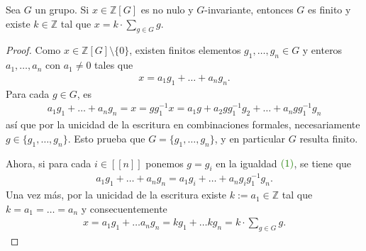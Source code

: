 \documentclass[11pt]{article}
\newcommand{\Z}{\mathbb{Z}}
\newcommand{\nat}[1]{[\![#1]\!]}
\newcommand{\paint}[1]{\color{color}{#1}}
\newenvironment{lemma}[2][Lema]{\begin{trivlist}
\item[\hskip \labelsep \paint{{\bfseries #1}}\hskip \labelsep {\bfseries #2.}]}{\end{trivlist}}
\begin{document}
\begin{lemma}{4} Sea $G$ un grupo. Si $x \in \Z[G]$ es no nulo y $G$-invariante, entonces $G$ es finito y existe $k \in \Z$ tal que $x = k \cdot \sum_{g \in G} g$.
\end{lemma}
\begin{proof} Como $x \in \Z[G] \setminus \{0\}$, existen finitos elementos $g_1, \dots, g_n \in G$ y enteros $a_1, \dots, a_n$ con $a_1 \neq 0$ tales que
\begin{align*}
x = a_1g_1 + \dots + a_ng_n.
\end{align*}
Para cada $g \in G$, es
\begin{align}
a_1g_1 + \dots + a_ng_n = x = gg_1^{-1}x = a_1g + a_2gg_1^{-1}g_2 + \dots + a_ngg_1^{-1}g_n
\end{align}
así que por la unicidad de la escritura en combinaciones formales, necesariamente $g \in \{g_1, \dots, g_n\}$. 
Esto prueba que $G = \{g_1, \dots, g_n\}$, y en particular $G$ resulta finito. 

Ahora, si para cada $i \in \nat{n}$ ponemos $g = g_i$ en la igualdad $\paint{(1)}$, se tiene que
\begin{align*}
a_1g_1 + \dots + a_ng_n = a_1g_i + \dots + a_ng_ig_1^{-1}g_n.
\end{align*}
Una vez más, por la unicidad de la escritura existe $k := a_1 \in \Z$ tal que $k = a_1 = \dots = a_n$ y consecuentemente
\begin{align*}
x = a_1g_1 + \dots a_ng_n = kg_1 + \dots kg_n = k \cdot \sum_{g \in G}g.
\end{align*}
\end{proof}
\end{document}
